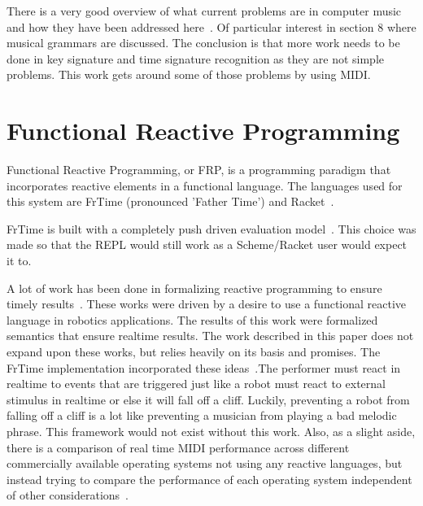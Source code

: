 \documentclass[12pt]{ucthesis}
\begin{document}
There is a very good overview of what current problems are in computer music and how they have been addressed here~\cite{Gerhard}. Of particular interest in section 8 where musical grammars are discussed. The conclusion is that more work needs to be done in key signature and time signature recognition as they are not simple problems. This work gets around some of those problems by using MIDI.

\section{Functional Reactive Programming}
\label{rw:frp}


Functional Reactive Programming, or FRP, is a programming paradigm that incorporates reactive elements in a functional language. The languages used for this system are FrTime (pronounced 'Father Time') and Racket~\cite{FrTime}.

FrTime is built with a completely push driven evaluation model~\cite{FrTime}. This choice was made so that the REPL would still work as a Scheme/Racket user would expect it to.

A lot of work has been done in formalizing reactive programming to ensure timely results~\cite{EventDriven}\cite{RealTime}. These works were driven by a desire to use a functional reactive language in robotics applications. The results of this work were formalized semantics that ensure realtime results. The work described in this paper does not expand upon these works, but relies heavily on its basis and promises. The FrTime implementation incorporated these ideas~\cite{FrTime}.The performer must react in realtime to events that are triggered just like a robot must react to external stimulus in realtime or else it will fall off a cliff. Luckily, preventing a robot from falling off a cliff is a lot like preventing a musician from playing a bad melodic phrase. This framework would not exist without this work. Also, as a slight aside, there is a comparison of real time MIDI performance across different commercially available operating systems not using any reactive languages, but instead trying to compare the performance of each operating system independent of other considerations~\cite{real-time-midi}.
\end{document}
